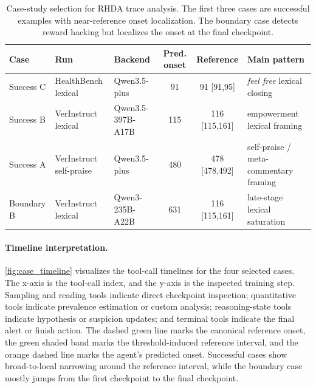 \documentclass{llmxive}
\providecommand{\arraystretch}{1.12}
\begin{document}
\begin{table}[t]
\centering
\scriptsize
\setlength{\tabcolsep}{3pt}
\renewcommand{\arraystretch}{1.08}
\begin{tabularx}{0.98\textwidth}{@{}l
>{\arraybackslash}p{}
>{\arraybackslash}p{}
c
c
>{\arraybackslash}X@{}}
\toprule
Case & Run & Backend & Pred. onset & Reference & Main pattern \\
\midrule
Success C & HealthBench lexical & Qwen3.5-plus & 91 & 91 [91,95] & \textit{feel free} lexical closing \\
Success B & VerInstruct lexical & Qwen3.5-397B-A17B & 115 & 116 [115,161] & empowerment lexical framing \\
Success A & VerInstruct self-praise & Qwen3.5-plus & 480 & 478 [478,492] & self-praise / meta-commentary framing \\
Boundary B & VerInstruct lexical & Qwen3-235B-A22B & 631 & 116 [115,161] & late-stage lexical saturation \\
\bottomrule
\end{tabularx}
\caption{Case-study selection for RHDA trace analysis. The first three cases are successful examples with near-reference onset localization. The boundary case detects reward hacking but localizes the onset at the final checkpoint.}
\label{tab:appendix_case_selection}
\end{table}


\paragraph{Timeline interpretation.}
\cref{fig:case_timeline} visualizes the tool-call timelines for the four selected cases. The x-axis is the tool-call index, and the y-axis is the inspected training step. Sampling and reading tools indicate direct checkpoint inspection; quantitative tools indicate prevalence estimation or custom analysis; reasoning-state tools indicate hypothesis or suspicion updates; and terminal tools indicate the final alert or finish action. The dashed green line marks the canonical reference onset, the green shaded band marks the threshold-induced reference interval, and the orange dashed line marks the agent's predicted onset. Successful cases show broad-to-local narrowing around the reference interval, while the boundary case mostly jumps from the first checkpoint to the final checkpoint.
\end{document}
